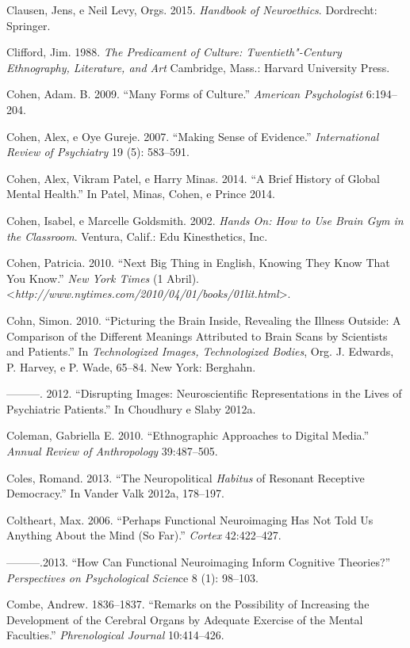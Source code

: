 Clausen, Jens, e Neil Levy, Orgs. 2015. \emph{Handbook of Neuroethics}.
Dordrecht: Springer.

Clifford, Jim. 1988. \emph{The Predicament of Culture: Twentieth"-Century
Ethnography, Literature, and Art} Cambridge, Mass.: Harvard University
Press.

Cohen, Adam. B. 2009. ``Many Forms of Culture.'' \emph{American
Psychologist} 6:194--204.

Cohen, Alex, e Oye Gureje. 2007. ``Making Sense of Evidence.''
\emph{International Review of Psychiatry} 19 (5): 583--591.

Cohen, Alex, Vikram Patel, e Harry Minas. 2014. ``A Brief History of
Global Mental Health.'' In Patel, Minas, Cohen, e Prince 2014.

Cohen, Isabel, e Marcelle Goldsmith. 2002. \emph{Hands On: How to Use
Brain Gym in the Classroom}. Ventura, Calif.: Edu Kinesthetics, Inc.

Cohen, Patricia. 2010. ``Next Big Thing in English, Knowing They Know
That You Know.'' \emph{New York Times} (1 Abril).
\textless{}\emph{http://www.nytimes.com/2010/04/01/books/01lit.html}\textgreater{}.

Cohn, Simon. 2010. ``Picturing the Brain Inside, Revealing the Illness
Outside: A Comparison of the Different Meanings Attributed to Brain
Scans by Scientists and Patients.'' In \emph{Technologized Images,
Technologized Bodies}, Org. J. Edwards, P. Harvey, e P. Wade, 65--84.
New York: Berghahn.

---------. 2012. ``Disrupting Images: Neuroscientific Representations in
the Lives of Psychiatric Patients.'' In Choudhury e Slaby 2012a.

Coleman, Gabriella E. 2010. ``Ethnographic Approaches to Digital
Media.'' \emph{Annual Review of Anthropology} 39:487--505.

Coles, Romand. 2013. ``The Neuropolitical \emph{Habitus} of Resonant
Receptive Democracy.'' In Vander Valk 2012a, 178--197.

Coltheart, Max. 2006. ``Perhaps Functional Neuroimaging Has Not Told Us
Anything About the Mind (So Far).'' \emph{Cortex} 42:422--427.

---------.2013. ``How Can Functional Neuroimaging Inform Cognitive
Theories?'' \emph{Perspectives on Psychological Scien}ce 8 (1): 98--103.

Combe, Andrew. 1836--1837. ``Remarks on the Possibility of Increasing
the Development of the Cerebral Organs by Adequate Exercise of the
Mental Faculties.'' \emph{Phrenological Journal} 10:414--426.

